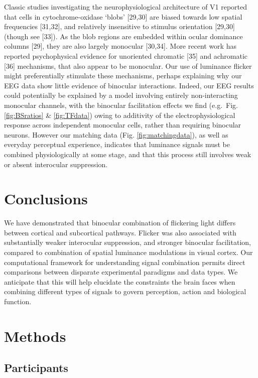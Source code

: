 \documentclass[
]{article}
\begin{document}
Classic studies investigating the neurophysiological architecture of V1 reported that cells in cytochrome-oxidase `blobs' {[}29,30{]} are biased towards low spatial frequencies {[}31,32{]}, and relatively insensitive to stimulus orientation {[}29,30{]} (though see {[}33{]}). As the blob regions are embedded within ocular dominance columns {[}29{]}, they are also largely monocular {[}30,34{]}. More recent work has reported psychophysical evidence for unoriented chromatic {[}35{]} and achromatic {[}36{]} mechanisms, that also appear to be monocular. Our use of luminance flicker might preferentially stimulate these mechanisms, perhaps explaining why our EEG data show little evidence of binocular interactions. Indeed, our EEG results could potentially be explained by a model involving entirely non-interacting monocular channels, with the binocular facilitation effects we find (e.g.~Fig. \ref{fig:BSratios} \& \ref{fig:TFdata}) owing to additivity of the electrophysiological response across independent monocular cells, rather than requiring binocular neurons. However our matching data (Fig. \ref{fig:matchingdata}), as well as everyday perceptual experience, indicates that luminance signals must be combined physiologically at some stage, and that this process still involves weak or absent interocular suppression.

\hypertarget{conclusions}{%
\section{Conclusions}\label{conclusions}}

We have demonstrated that binocular combination of flickering light differs between cortical and subcortical pathways. Flicker was also associated with substantially weaker interocular suppression, and stronger binocular facilitation, compared to combination of spatial luminance modulations in visual cortex. Our computational framework for understanding signal combination permits direct comparisons between disparate experimental paradigms and data types. We anticipate that this will help elucidate the constraints the brain faces when combining different types of signals to govern perception, action and biological function.

\hypertarget{methods}{%
\section{Methods}\label{methods}}

\hypertarget{participants}{%
\subsection{Participants}\label{participants}}
\end{document}
